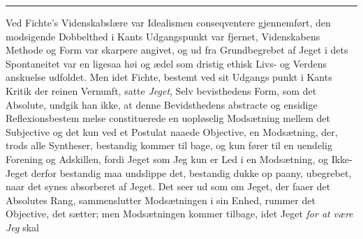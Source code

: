 \documentclass[12pt,a4paper]{book}
\newcommand{\divrule}{\begin{center}\rule{2cm}{0.4pt}\end{center}}
\begin{document}
\divrule

Ved Fichte's Videnskabslære var Idealismen conseqventere
gjennemført, den modsigende Dobbelthed i Kants Udgangspunkt
var fjernet, Videnskabens Methode og Form var skarpere angivet,
og ud fra Grundbegrebet af Jeget i dets Spontaneitet var en
ligesaa høi og ædel som dristig ethisk Livs- og Verdens\-%
anskuelse udfoldet. Men idet Fichte, bestemt ved sit Udgangs\-%
punkt i Kants Kritik der reinen Vernunft, satte \emph{Jeget}, Selv\-%
bevisthedens Form, som det Absolute, undgik han ikke, at
denne Bevidsthedens abstracte og ensidige Reflexionsbestem\-%
melse constituerede en uopløselig Modsætning mellem det
Subjective og det kun ved et Postulat naaede Objective, en
Modsætning, der, trods alle Syntheser, bestandig kommer til\-%
bage, og kun fører til en uendelig Forening og Adskillen, fordi
Jeget som Jeg kun er Led i en Modsætning, og Ikke-Jeget
derfor bestandig maa undslippe det, bestandig dukke op paany,
ubegrebet, naar det synes absorberet af Jeget. Det seer ud
som om Jeget, der faaer det Absolutes Rang, sammenslutter
Modsætningen i sin Enhed, rummer det Objective, det sætter; men
Modsætningen kommer tilbage, idet Jeget \emph{for at være Jeg} skal
\end{document}
